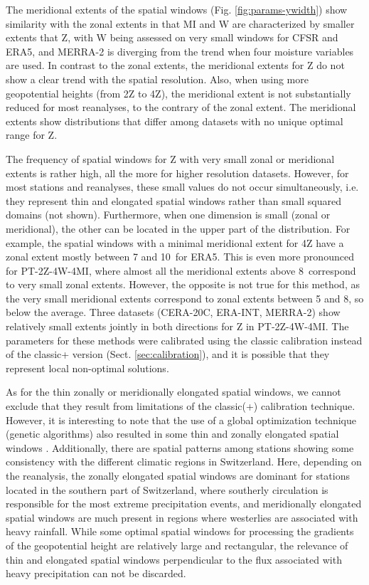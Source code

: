\documentclass[alpha-refs]{wiley-article}
\begin{document}
The meridional extents of the spatial windows (Fig. \ref{fig:params-ywidth}) show similarity with the zonal extents in that MI and W are characterized by smaller extents that Z, with W being assessed on very small windows for CFSR and ERA5, and MERRA-2 is diverging from the trend when four moisture variables are used. In contrast to the zonal extents, the meridional extents for Z do not show a clear trend with the spatial resolution. Also, when using more geopotential heights (from 2Z to 4Z), the meridional extent is not substantially reduced for most reanalyses, to the contrary of the zonal extent. The meridional extents show distributions that differ among datasets with no unique optimal range for Z. 

The frequency of spatial windows for Z with very small zonal or meridional extents is rather high, all the more for higher resolution datasets. However, for most stations and reanalyses, these small values do not occur simultaneously, i.e. they represent thin and elongated spatial windows rather than small squared domains (not shown). Furthermore, when one dimension is small (zonal or meridional), the other can be located in the upper part of the distribution. For example, the spatial windows with a minimal meridional extent for 4Z have a zonal extent mostly between 7 and 10\degree\ for ERA5. This is even more pronounced for PT-2Z-4W-4MI, where almost all the meridional extents above 8\degree\ correspond to very small zonal extents. However, the opposite is not true for this method, as the very small meridional extents correspond to zonal extents between 5 and 8\degree, so below the average. Three datasets (CERA-20C, ERA-INT, MERRA-2) show relatively small extents jointly in both directions for Z in PT-2Z-4W-4MI. The parameters for these methods were calibrated using the classic calibration instead of the classic+ version (Sect. \ref{sec:calibration}), and it is possible that they represent local non-optimal solutions. 

As for the thin zonally or meridionally elongated spatial windows, we cannot exclude that they result from limitations of the classic(+) calibration technique. However, it is interesting to note that the use of a global optimization technique (genetic algorithms) also resulted in some thin and zonally elongated spatial windows \citep{Horton2018a}. Additionally, there are spatial patterns among stations showing some consistency with the different climatic regions in Switzerland. Here, depending on the reanalysis, the zonally elongated spatial windows are dominant for stations located in the southern part of Switzerland, where southerly circulation is responsible for the most extreme precipitation events, and meridionally elongated spatial windows are much present in regions where westerlies are associated with heavy rainfall. While some optimal spatial windows for processing the gradients of the geopotential height are relatively large and rectangular, the relevance of thin and elongated spatial windows perpendicular to the flux associated with heavy precipitation can not be discarded.
\end{document}
